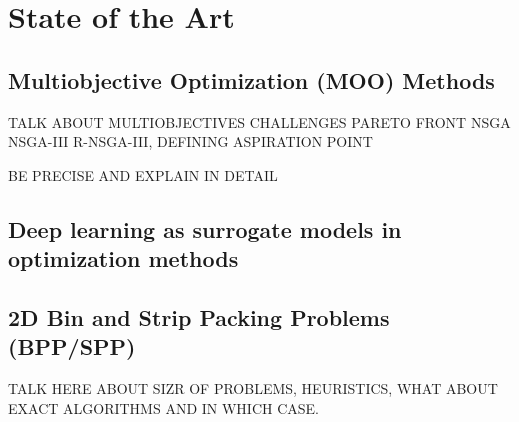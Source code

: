 \section{State of the Art}


\subsection*{Multiobjective Optimization (MOO) Methods}

TALK ABOUT MULTIOBJECTIVES CHALLENGES
PARETO FRONT
NSGA
NSGA-III
R-NSGA-III, DEFINING ASPIRATION POINT

BE PRECISE AND EXPLAIN IN DETAIL

\subsection*{Deep learning as surrogate models in optimization methods}

\subsection*{2D Bin and Strip Packing Problems (BPP/SPP)}

TALK HERE ABOUT SIZR OF PROBLEMS, HEURISTICS, WHAT ABOUT EXACT ALGORITHMS AND IN WHICH CASE.